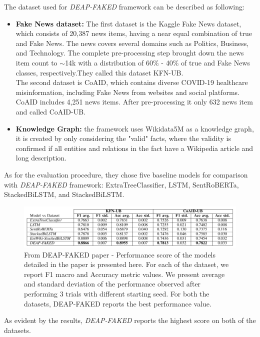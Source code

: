 \documentclass[10pt, english]{report}
\begin{document}
The dataset used for \textit{DEAP-FAKED} framework can be described as following:

\begin{itemize}
\item \textbf{Fake News dataset:} The first dataset is the Kaggle Fake News dataset, which consists of 20,387 news items, having a near equal combination of true and Fake News. The news covers several domains such as Politics, Business, and Technology.
The complete pre-processing step brought down the news item count to  $\sim$14k with a distribution of 60\% - 40\% of true and Fake News classes, respectively.They called this dataset KFN-UB.\\
The second dataset is CoAID, which contains diverse COVID-19 healthcare misinformation, including Fake News from websites and social platforms. CoAID includes 4,251 news items. After pre-processing it only 632 news item and called CoAID-UB.
\item \textbf{Knowledge Graph:} the framework uses Wikidata5M as a knowledge graph, it is created by only considering the "valid" facts, where the validity is confirmed if all entities and relations in the fact have a Wikipedia article and long description.
\end{itemize}

As for the evaluation procedure, they chose five baseline models for comparison with \textit{DEAP-FAKED} framework: ExtraTreeClassifier, LSTM, SentRoBERTa, StackedBiLSTM, and StackedBiLSTM.

\begin{figure}[H]
	\centering
	\includegraphics[scale=0.4]{img/deap_faked_evaluation.png}
	\caption{From DEAP-FAKED paper - Performance score of the models detailed in the paper is presented here. For each of the dataset, we report F1 macro and Accuracy metric values. We present average and standard deviation of the performance observed after performing 3 trials with different starting seed. For both the datasets, DEAP-FAKED reports the best performance value.}
\end{figure}

As evident by the results, \textit{DEAP-FAKED} reports the highest score on both of the datasets.
\end{document}
